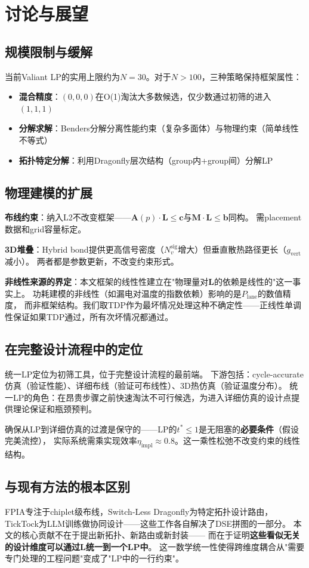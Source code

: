 \chapter{讨论与展望}\label{chap:discussion}

\section{规模限制与缓解}

当前Valiant LP的实用上限约为$N=30$。对于$N > 100$，三种策略保持框架属性：
\begin{itemize}
    \item \textbf{混合精度}：$(0,0,0)$在O(1)淘汰大多数候选，仅少数通过初筛的进入$(1,1,1)$
    \item \textbf{分解求解}：Benders分解分离性能约束（复杂多面体）与物理约束（简单线性不等式）
    \item \textbf{拓扑特定分解}：利用Dragonfly层次结构（group内+group间）分解LP
\end{itemize}

\section{物理建模的扩展}

\textbf{布线约束}：纳入L2不改变框架——$\mathbf{A}(p) \cdot \mathbf{L} \le \mathbf{c}$与$\mathbf{M} \cdot \mathbf{L} \le \mathbf{b}$同构。
需placement数据和grid容量标定。

\textbf{3D堆叠}：Hybrid bond提供更高信号密度（$N_v^{\text{sig}}$增大）但垂直散热路径更长（$g_{\text{vert}}$减小）。
两者都是参数更新，不改变约束形式。

\textbf{非线性来源的界定}：本文框架的线性性建立在"物理量对$\mathbf{L}$的依赖是线性的"这一事实上。
功耗建模的非线性（如漏电对温度的指数依赖）影响的是$P_{\text{lane}}$的数值精度，
而非框架结构。我们取TDP作为最坏情况处理这种不确定性——正线性单调性保证如果TDP通过，所有次坏情况都通过。

\section{在完整设计流程中的定位}

统一LP定位为初筛工具，位于完整设计流程的最前端。
下游包括：cycle-accurate仿真（验证性能）、详细布线（验证可布线性）、3D热仿真（验证温度分布）。
统一LP的角色：在昂贵步骤之前快速淘汰不可行候选，为进入详细仿真的设计点提供理论保证和瓶颈预判。

确保从LP到详细仿真的过渡是保守的——LP的$t^* \le 1$是无阻塞的\textbf{必要条件}（假设完美流控），
实际系统需乘实现效率$\eta_{\text{impl}} \approx 0.8$。这一乘性松弛不改变约束的线性结构。

\section{与现有方法的根本区别}

FPIA专注于chiplet级布线，Switch-Less Dragonfly为特定拓扑设计路由，
TickTock为LLM训练做协同设计——这些工作各自解决了DSE拼图的一部分。
本文的核心贡献不在于提出新拓扑、新路由或新封装——
而在于证明\textbf{这些看似无关的设计维度可以通过$\mathbf{L}$统一到一个LP中}。
这一数学统一性使得跨维度耦合从"需要专门处理的工程问题"变成了"LP中的一行约束"。
